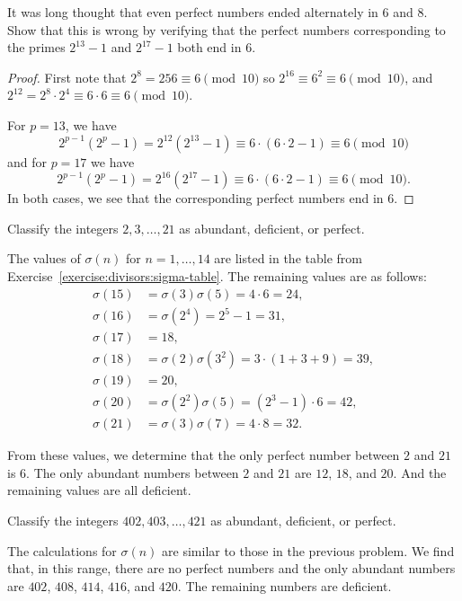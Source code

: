  It was long thought that even perfect numbers ended
alternately in $6$ and $8$. Show that this is wrong by verifying that
the perfect numbers corresponding to the primes $2^{13} - 1$ and
$2^{17} - 1$ both end in $6$.
\begin{proof}
  First note that $2^8 = 256\equiv6\pmod{10}$ so
  $2^{16}\equiv6^2\equiv6\pmod{10}$, and
  $2^{12} = 2^8\cdot2^4\equiv6\cdot6\equiv6\pmod{10}$.

  For $p = 13$, we have
  \begin{equation*}
    2^{p-1}(2^p - 1)
    = 2^{12}(2^{13} - 1)
    \equiv 6\cdot(6\cdot2 - 1)
    \equiv6\pmod{10}
  \end{equation*}
  and for $p = 17$ we have
  \begin{equation*}
    2^{p-1}(2^p - 1)
    = 2^{16}(2^{17} - 1)
    \equiv 6\cdot(6\cdot2 - 1)
    \equiv6\pmod{10}.
  \end{equation*}
  In both cases, we see that the corresponding perfect numbers end in
  $6$.
\end{proof}

 Classify the integers $2,3,\dots,21$ as abundant, deficient,
or perfect.
\begin{solution}
  The values of $\sigma(n)$ for $n = 1,\dots,14$ are listed in the
  table from Exercise~\ref{exercise:divisors:sigma-table}. The
  remaining values are as follows:
  \begin{align*}
    \sigma(15) &= \sigma(3)\sigma(5) = 4\cdot6 = 24, \\
    \sigma(16) &= \sigma(2^4) = 2^5 - 1 = 31, \\
    \sigma(17) &= 18, \\
    \sigma(18) &= \sigma(2)\sigma(3^2) = 3\cdot(1 + 3 + 9) = 39, \\
    \sigma(19) &= 20, \\
    \sigma(20) &= \sigma(2^2)\sigma(5) = (2^3 - 1)\cdot6 = 42, \\
    \sigma(21) &= \sigma(3)\sigma(7) = 4\cdot8 = 32.
  \end{align*}

  From these values, we determine that the only perfect number between
  $2$ and $21$ is $6$. The only abundant numbers between $2$ and $21$
  are $12$, $18$, and $20$. And the remaining values are all
  deficient.
\end{solution}

 Classify the integers $402, 403, \dots, 421$ as abundant,
deficient, or perfect.
\begin{solution}
  The calculations for $\sigma(n)$ are similar to those in the
  previous problem. We find that, in this range, there are no perfect
  numbers and the only abundant numbers are $402$, $408$, $414$,
  $416$, and $420$. The remaining numbers are deficient.
\end{solution}

